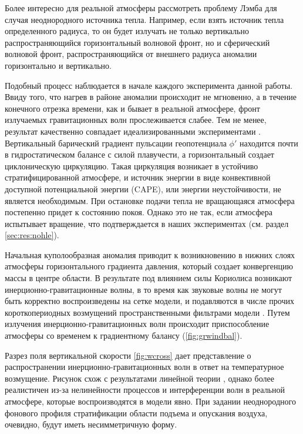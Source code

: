 \documentclass[12pt,a4paper]{report}
\begin{document}
Более интересно для реальной атмосферы рассмотреть проблему Лэмба для случая неоднородного источника тепла. Например, если взять источник тепла определенного радиуса, то он будет излучать не только вертикально распространяющийся горизонтальный волновой фронт, но и сферический волновой фронт, распространяющийся от внешнего радиуса аномалии горизонтально и вертикально. 

Подобный процесс наблюдается в начале каждого эксперимента данной работы. Ввиду того, что нагрев в районе аномалии происходит не мгновенно, а в течение конечного отрезка времени, как и бывает в реальной атмосфере,  фронт излучаемых гравитационных волн прослеживается слабее. Тем не менее, результат качественно совпадает идеализированными экспериментами \citep{RT2003}. Вертикальный барический градиент пульсации геопотенциала $\phi'$ находится почти в гидростатическом балансе с силой плавучести, а горизонтальный создает циклоническую циркуляцию. Такая циркуляция возникает в устойчиво стратифицированной атмосфере, и источник энергии в виде конвективной доступной потенциальной энергии (CAPE), или энергии неустойчивости, не является необходимым. При остановке подачи тепла не вращающаяся атмосфера постепенно придет к состоянию покоя. Однако это не так, если атмосфера испытывает вращение, что подтверждается в наших экспериментах (см. раздел \ref{sec:res:nohle}).

\begin{wrapfigure}{l}{0.5\textwidth}
\begin{center}
\texttt{[image: \{./chapters/figures\_results/slpmin\_vortmax.00h-43h.ctrl]}.png}
\end{center}
\caption{Изменение аномалии приземного давления и максимальной завихренности во времени. Эксперимент CTRL.}
\label{fig:ctrl_slpminvortmax}
\end{wrapfigure}

Начальная куполообразная аномалия приводит к возникновению в нижних слоях атмосферы горизонтального градиента давления, который создает конвергенцию массы в центре области. В результате под влиянием силы Кориолиса возникают инерционно-гравитационные волны, в то время как  звуковые волны не могут быть корректно воспроизведены на сетке модели, и подавляются в числе прочих короткопериодных возмущений пространственными фильтрами модели \citep{MillerWhite1984,MirandaPhD}. Путем излучения инерционно-гравитационных волн происходит приспособление атмосферы со временем к градиентному балансу (\ref{fig:grwindbal}).

Разрез поля вертикальной скорости \ref{fig:wcross} дает представление о распространении инерционно-гравитационных волн в ответ на температурное возмущение. Рисунок схож с результатами линейной теории \citep{Lin2007}, однако более реалистичен из-за нелинейности процессов и интерференции волн в реальной атмосфере, которые воспроизводятся в модели явно. При задании неоднородного фонового профиля стратификации области подъема и опускания воздуха, очевидно, будут иметь несимметричную форму.
\end{document}

